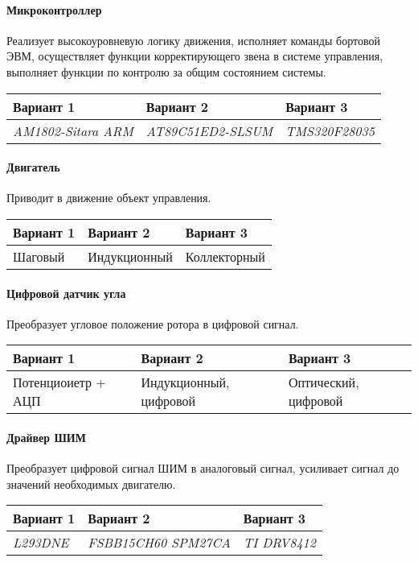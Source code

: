 \paragraph{Микроконтроллер}
Реализует высокоуровневую логику движения, исполняет команды бортовой ЭВМ,
осуществляет функции корректирующего звена в системе управления, выполняет
функции по контролю за общим состоянием системы.

\begin{tabular}{|p{5cm}|p{5cm}|p{5cm}|}
    \hline
    Вариант 1 & Вариант 2 & Вариант 3 \\
    \hline
    \textit{AM1802-Sitara ARM} &
    \textit{AT89C51ED2-SLSUM} &
    \textit{TMS320F28035} \\
    \hline
\end{tabular}

\paragraph{Двигатель}
Приводит в движение объект управления.

\begin{tabular}{|p{5cm}|p{5cm}|p{5cm}|}
    \hline
    Вариант 1 & Вариант 2 & Вариант 3 \\
    \hline
    Шаговый &
    Индукционный &
    Коллекторный \\
    \hline
\end{tabular}

\paragraph{Цифровой датчик угла}
Преобразует угловое положение ротора в цифровой сигнал.

\begin{tabular}{|p{5cm}|p{5cm}|p{5cm}|}
    \hline
    Вариант 1 & Вариант 2 & Вариант 3 \\
    \hline
    Потенциоиетр + АЦП &
    Индукционный, цифровой &
    Оптический, цифровой \\
    \hline
\end{tabular}

\paragraph{Драйвер ШИМ}
Преобразует цифровой сигнал ШИМ в аналоговый сигнал,
усиливает сигнал до значений необходимых двигателю.

\begin{tabular}{|p{5cm}|p{5cm}|p{5cm}|}
    \hline
    Вариант 1 & Вариант 2 & Вариант 3 \\
    \hline
    \textit{L293DNE} &
    \textit{FSBB15CH60 SPM27CA} &
    \textit{TI DRV8412} \\
    \hline
\end{tabular}

